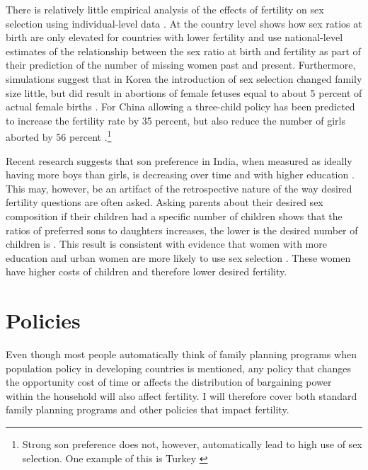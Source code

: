 \documentclass[]{article}
\begin{document}
There is relatively little empirical analysis of the effects of fertility on sex selection using individual-level data \citep{park95,Ebenstein2011}. At the country level \citet{Bongaarts2013} shows how sex ratios at birth are only elevated for countries with lower fertility and \citet{Bongaarts2015} use national-level estimates of the relationship between the sex ratio at birth and fertility as part of their prediction of the number of missing women past and present. Furthermore, simulations suggest that in Korea the introduction of sex selection changed family size little, but did result in abortions of female fetuses equal to about 5 percent of actual female births \citep{park95}. For China allowing a three-child policy has been predicted to increase the fertility rate by 35 percent, but also reduce the number of girls aborted by 56 percent \citep{Ebenstein2011}.\footnote{Strong son preference does not, however, automatically lead to high use of sex selection. One example of this is Turkey \citep{Altindag2016}}

Recent research suggests that son preference in India, when measured as ideally having more boys than girls, is decreasing over time and with higher education \citep{bhat03,pande07}. This may, however, be an artifact of the retrospective nature of the way desired fertility questions are often asked. Asking parents about their desired sex composition if their children had a specific number of children shows that the ratios of preferred sons to daughters increases, the lower is the desired number of children is \citep{Jayachandran2017}. This result is consistent with evidence that women with more education and urban women are more likely to use sex selection \citet{Portner2015b}. These women have higher costs of children and therefore lower desired fertility.

\section{Policies}\label{policies}

Even though most people automatically think of family planning programs when population policy in developing countries is mentioned, any policy that changes the opportunity cost of time or affects the distribution of bargaining power within the household will also affect fertility. I will therefore cover both standard family planning programs and other policies that impact fertility.
\end{document}
